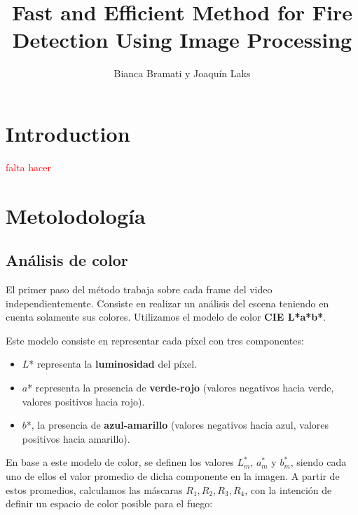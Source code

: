 \documentclass[a4paper]{article}
\title{Fast and Efficient Method for
Fire Detection Using Image Processing}
\author{Bianca Bramati y Joaquín Laks}
\date{}
\begin{document}
\maketitle

\section{Introduction}
\textcolor{red}{falta hacer}

\section{Metolodología}

\subsection{Análisis de color}
El primer paso del método trabaja sobre cada frame del video independientemente. Consiste en realizar un análisis del escena teniendo en cuenta solamente sus colores. Utilizamos el modelo de color \textbf{CIE L*a*b*}.

Este modelo consiste en representar cada píxel con tres componentes:
\begin{itemize}
    \item $L$* representa la \textbf{luminosidad} del píxel.
    \item $a$* representa la presencia de \textbf{verde-rojo} (valores negativos hacia verde, valores positivos hacia rojo).
    \item $b$*, la presencia de \textbf{azul-amarillo} (valores negativos hacia azul, valores positivos hacia amarillo).
\end{itemize}

\begin{figure}[H]
    \centering    
\end{figure}

En base a este modelo de color, se definen los valores $L^*_m$, $a^*_m$ y $b^*_m$, siendo cada uno de ellos el valor promedio de dicha componente en la imagen. A partir de estos promedios, calculamos las máscaras $R_1, R_2, R_3, R_4$, con la intención de definir un espacio de color posible para el fuego:
\end{document}
